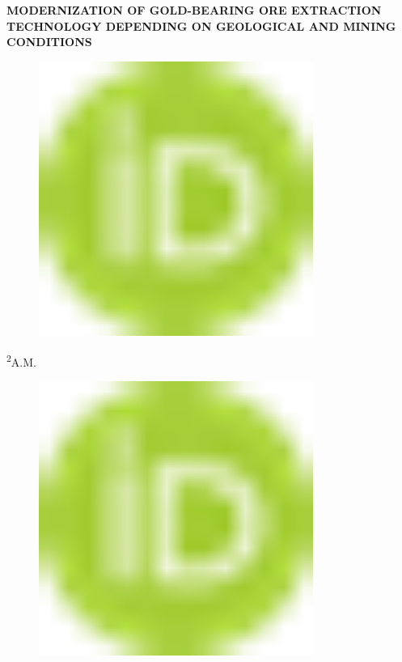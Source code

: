 
{\bfseries MODERNIZATION OF GOLD-BEARING ORE EXTRACTION TECHNOLOGY
DEPENDING ON GEOLOGICAL AND MINING CONDITIONS}

\begin{figure}[H]
	\centering
	\includegraphics[width=0.8\textwidth]{media/gorn2/image1}
	\caption*{}
\end{figure}

\textsuperscript{2}A.M.
\begin{figure}[H]
	\centering
	\includegraphics[width=0.8\textwidth]{media/gorn2/image1}
	\caption*{}
\end{figure}


